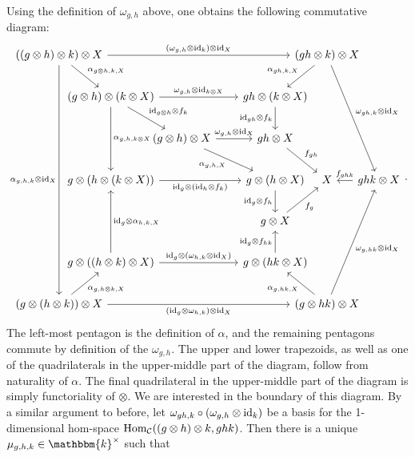 \documentclass[12pt, reqno]{amsart}
\numberwithin{equation}{section}
\theoremstyle{plainspace}
\theoremstyle{definitionspace}
\theoremstyle{remarkspace}
\renewenvironment{proof}{{\noindent\textbf{Proof.}}}{\null\hfill\qedsymbol}
\newcommand{\id}{\textup{id}}
\newcommand{\mathcat}[1]{\mathcal{#1}}
\newcommand{\Hom}[2][]{
	\ifthenelse{\equal{#2}{}}
		{\textup{Hom}_{#1}}
		{\textup{Hom}_{#1}\!\left(#2\right)}
}
\begin{document}
\begin{proof}
\noindent Using the definition of $\omega_{g,h}$ above, one obtains the following commutative diagram:
\begin{equation*}
\begin{tikzcd}[/tikz/column 1/.style={column sep = -4.0em}, /tikz/column 1/.style={column sep = -4.0em}, /tikz/column 2/.style={column sep = -1.0em}, /tikz/column 3/.style={column sep = 2.0em}, /tikz/column 4/.style={column sep = -2.0em}, /tikz/column 5/.style={column sep = -1.0em}, row sep = 2.0em]
{((g \otimes h) \otimes k) \otimes X} \arrow[dr, "{\alpha_{g \otimes h,k,X}}"] \arrow[rrrr, "{(\omega_{g,h} \otimes \id_k) \otimes \id_X}"] \arrow[dddddd, "{\alpha_{g,h,k} \otimes \id_X}"'] & & & & {(gh \otimes k) \otimes X} \arrow[dl, "{\alpha_{gh,k,X}}"'] \arrow[dddr, "{\omega_{gh,k} \otimes \id_X}"] \\
& {(g \otimes h) \otimes (k \otimes X)} \arrow[dd, "{\alpha_{g,h,k \otimes X}}"] \arrow[dr, "{\id_{g \otimes h} \otimes f_k}"] \arrow[rr, "{\omega_{g,h} \otimes \id_{k \otimes X}}"] & & {gh \otimes (k \otimes X)} \arrow[d, "{\id_{gh} \otimes f_k}"'] \\
& & {(g \otimes h) \otimes X} \arrow[dr, "{\alpha_{g,h,X}}"'] \arrow[r, "{\omega_{g,h} \otimes \id_X}"] & {gh \otimes X} \arrow[dr, "{f_{gh}}"] \\
& {g \otimes (h \otimes (k \otimes X))} \arrow[rr, "{\id_g \otimes (\id_h \otimes f_k)}"'] & & {g \otimes (h \otimes X)} \arrow[d, "{\id_g \otimes f_h}"'] & {X} & {ghk \otimes X} \arrow[l, "{f_{ghk}}"'] \\
& & & {g \otimes X} \arrow[ur, "{f_g}"'] \\
& {g \otimes ((h \otimes k) \otimes X)} \arrow[uu, "{\id_g \otimes \alpha_{h,k,X}}"'] \arrow[rr, "{\id_g \otimes (\omega_{h,k} \otimes \id_X)}"] & & {g \otimes (hk \otimes X)} \arrow[u, "{\id_g \otimes f_{hk}}"] \\
{(g \otimes (h \otimes k)) \otimes X} \arrow[rrrr, "{(\id_g \otimes \omega_{h,k}) \otimes \id_X}"'] \arrow[ur, "{\alpha_{g,h \otimes k,X}}"'] & & & & {(g \otimes hk) \otimes X} \arrow[uuur, "{\omega_{g,hk} \otimes \id_X}"'] \arrow[ul, "{\alpha_{g,hk,X}}"]
\end{tikzcd}.
\end{equation*}
\noindent The left-most pentagon is the definition of $\alpha$, and the remaining pentagons commute by definition of the $\omega_{g,h}$. The upper and lower trapezoids, as well as one of the quadrilaterals in the upper-middle part of the diagram, follow from naturality of $\alpha$. The final quadrilateral in the upper-middle part of the diagram is simply functoriality of $\otimes$. We are interested in the boundary of this diagram. By a similar argument to before, let $\omega_{gh,k} \circ (\omega_{g,h} \otimes \id_k)$ be a basis for the 1-dimensional hom-space $\Hom[\mathcat{C}]{(g \otimes h) \otimes k, ghk}$. Then there is a unique $\mu_{g,h,k} \in \mathbbm{k}^{\times}$ such that

\end{proof}
\end{document}
